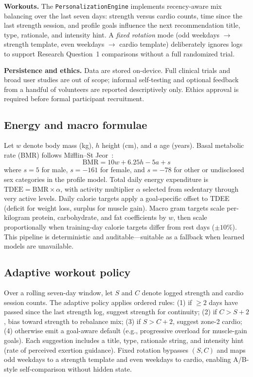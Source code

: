 \documentclass[conference]{IEEEtran}
\begin{document}
\textbf{Workouts.} The \texttt{PersonalizationEngine} implements recency-aware mix balancing over the last seven days: strength versus cardio counts, time since the last strength session, and profile goals influence the next recommendation title, type, rationale, and intensity hint. A \emph{fixed rotation} mode (odd weekdays $\rightarrow$ strength template, even weekdays $\rightarrow$ cardio template) deliberately ignores logs to support Research Question~1 comparisons without a full randomized trial.

\textbf{Persistence and ethics.} Data are stored on-device. Full clinical trials and broad user studies are out of scope; informal self-testing and optional feedback from a handful of volunteers are reported descriptively only. Ethics approval is required before formal participant recruitment.

\subsection{Energy and macro formulae}
Let $w$ denote body mass (kg), $h$ height (cm), and $a$ age (years). Basal metabolic rate (BMR) follows Mifflin--St Jeor~\cite{armand2024systematic}:
\begin{equation}
\mathrm{BMR} = 10w + 6.25h - 5a + s
\end{equation}
where $s{=}5$ for male, $s{=}{-}161$ for female, and $s{=}{-}78$ for other or undisclosed sex categories in the profile model. Total daily energy expenditure is $\mathrm{TDEE} = \mathrm{BMR} \times \alpha$, with activity multiplier $\alpha$ selected from sedentary through very active levels. Daily calorie targets apply a goal-specific offset to TDEE (deficit for weight loss, surplus for muscle gain). Macro gram targets scale per-kilogram protein, carbohydrate, and fat coefficients by $w$, then scale proportionally when training-day calorie targets differ from rest days ($\pm 10\%$). This pipeline is deterministic and auditable---suitable as a fallback when learned models are unavailable.

\subsection{Adaptive workout policy}
Over a rolling seven-day window, let $S$ and $C$ denote logged strength and cardio session counts. The adaptive policy applies ordered rules: (1) if $\geq 2$ days have passed since the last strength log, suggest strength for continuity; (2) if $C > S + 2$, bias toward strength to rebalance mix; (3) if $S > C + 2$, suggest zone-2 cardio; (4) otherwise emit a goal-aware default (e.g., progressive overload for muscle-gain goals). Each suggestion includes a title, type, rationale string, and intensity hint (rate of perceived exertion guidance). Fixed rotation bypasses $(S,C)$ and maps odd weekdays to a strength template and even weekdays to cardio, enabling A/B-style self-comparison without hidden state.
\end{document}
